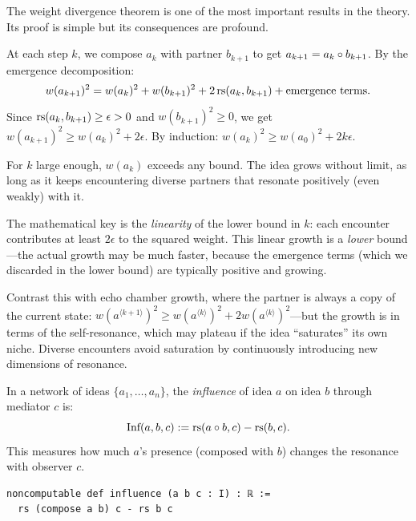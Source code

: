\begin{remark}
\label{rem:weight-divergence-intuition}
The weight divergence theorem is one of the most important results in the
theory.  Its proof is simple but its consequences are profound.

At each step $k$, we compose $a_k$ with partner $b_{k+1}$ to get
$a_{k+1} = a_k \circ b_{k+1}$.  By the emergence decomposition:
\[
  w(a_{k+1})^2 = w(a_k)^2 + w(b_{k+1})^2 + 2\,\mathrm{rs}(a_k, b_{k+1})
  + \text{emergence terms}.
\]
Since $\mathrm{rs}(a_k, b_{k+1}) \geq \epsilon > 0$ and $w(b_{k+1})^2 \geq 0$,
we get $w(a_{k+1})^2 \geq w(a_k)^2 + 2\epsilon$.  By induction:
$w(a_k)^2 \geq w(a_0)^2 + 2k\epsilon$.

For $k$ large enough, $w(a_k)$ exceeds any bound.  The idea grows
without limit, as long as it keeps encountering diverse partners that
resonate positively (even weakly) with it.

The mathematical key is the \emph{linearity} of the lower bound in $k$:
each encounter contributes at least $2\epsilon$ to the squared weight.
This linear growth is a \emph{lower} bound---the actual growth may be
much faster, because the emergence terms (which we discarded in the lower
bound) are typically positive and growing.

Contrast this with echo chamber growth, where the partner is always a copy
of the current state: $w(a^{\langle k+1 \rangle})^2 \geq w(a^{\langle k
\rangle})^2 + 2w(a^{\langle k \rangle})^2$---but the growth is in terms of
the self-resonance, which may plateau if the idea ``saturates'' its own
niche.  Diverse encounters avoid saturation by continuously introducing new
dimensions of resonance.
\end{remark}

\begin{definition}
\label{def:influence-maximization}
In a network of ideas $\{a_1, \ldots, a_n\}$, the \emph{influence} of idea
$a$ on idea $b$ through mediator $c$ is:
\[
  \text{Inf}(a, b, c) := \mathrm{rs}(a \circ b, c) - \mathrm{rs}(b, c).
\]
This measures how much $a$'s presence (composed with $b$) changes the
resonance with observer $c$.

\begin{lstlisting}[caption={Lean 4: Influence}]
noncomputable def influence (a b c : I) : ℝ :=
  rs (compose a b) c - rs b c
\end{lstlisting}
\end{definition}

